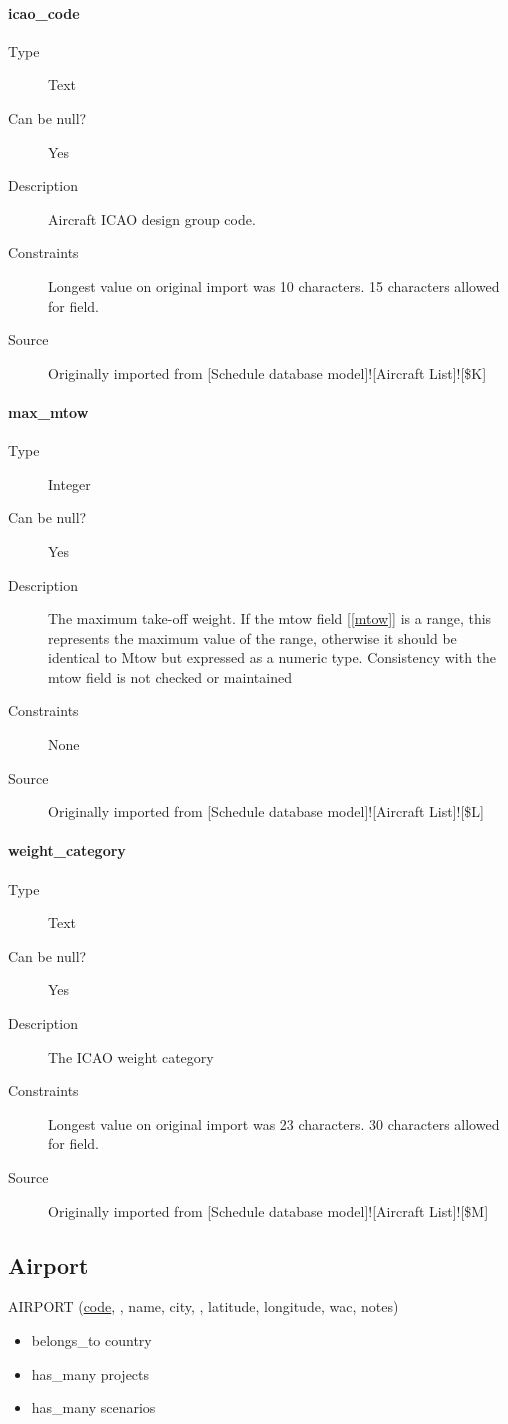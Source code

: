 \documentclass[]{report}
\begin{document}
\paragraph{icao\_code}
\label{subsec:icaocode}
	\begin{description}
	\item[Type]Text
	\item[Can be null?]Yes
	\item[Description]Aircraft ICAO design group code.
	\item[Constraints]Longest value on original import was 10 characters. 15 characters allowed for field.
	\item[Source]Originally imported from [Schedule database model]![Aircraft List]![\$K]
	\end{description}
\paragraph{max\_mtow}
	\begin{description}
	\item[Type]Integer
	\item[Can be null?]Yes
	\item[Description]The maximum take-off weight. If the mtow field [\ref{mtow}] is a range, this represents the maximum value of the range, otherwise it should be identical to Mtow but expressed as a numeric type. Consistency with the mtow field is not checked or maintained
	\item[Constraints]None
	\item[Source]Originally imported from [Schedule database model]![Aircraft List]![\$L]
	\end{description}
\paragraph{weight\_category} 
	\begin{description}
	\item[Type]Text
	\item[Can be null?]Yes
	\item[Description]The ICAO weight category
	\item[Constraints]Longest value on original import was 23 characters. 30 characters allowed for field.
	\item[Source]Originally imported from [Schedule database model]![Aircraft List]![\$M]
	\end{description}
\subsection{Airport}
AIRPORT (\underline{code}, , name, city, , latitude, longitude, wac, notes)
\begin{itemize}
\item belongs\_to country
\item has\_many projects
\item has\_many scenarios
\end{itemize}
\end{document}
